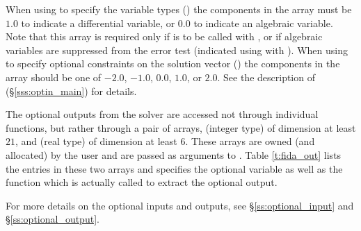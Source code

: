 When using  to specify the variable types ()
the components in the array  must be $1.0$ to indicate a differential
variable, or $0.0$ to indicate an algebraic variable.
Note that this array is required only if  is to be called
with , or if algebraic variables are suppressed from the error
test (indicated using  with ).
%
When using  to specify optional constraints on the
solution vector () the components in the
array  should be one of $-2.0$, $-1.0$, $0.0$, $1.0$, or $2.0$.
See the description of  (\S\ref{sss:optin_main})
for details.

The optional outputs from the {\ida} solver are accessed not through
individual functions, but rather through a pair of arrays, 
(integer type) of dimension at least $21$, and  (real type) of
dimension at least $6$.  These arrays are owned (and allocated) by
the user and are passed as arguments to .  Table
\ref{t:fida_out} lists the entries in these two arrays and specifies
the optional variable as well as the {\ida} function which is actually
called to extract the optional output.

For more details on the optional inputs and outputs, see \S\ref{ss:optional_input}
and \S\ref{ss:optional_output}.

